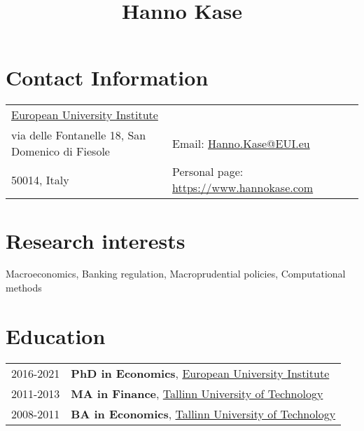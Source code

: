 \documentclass[a4, 11pt]{article}
\title{ {\Huge  Hanno Kase} }
\date{}
\begin{document}
    \maketitle


    \section*{Contact Information}
    \begin{table}[H]
      \begin{tabular}{ll}\href{https://www.eui.eu/}{European University Institute}&\\
        via delle Fontanelle 18, San Domenico di Fiesole&
        Email: \href{mailto:Hanno.Kase@EUI.eu}{Hanno.Kase@EUI.eu} \\
        50014, Italy& Personal page: \href{https://www.hannokase.com}{https://www.hannokase.com}
      \end{tabular}
    \end{table}

    \section*{Research interests}Macroeconomics, Banking regulation, Macroprudential policies, Computational methods

    \section*{Education}\begin{table}[H]
        \begin{tabular}{p{2cm}p{14cm}}
            2016-2021 & \textbf{PhD in Economics}, \href{https://www.eui.eu}{European University Institute}\\
            2011-2013 & \textbf{MA in Finance}, \href{https://www.ttu.ee/en}{Tallinn University of Technology}\\
            2008-2011 & \textbf{BA in Economics}, \href{https://www.ttu.ee/en}{Tallinn University of Technology}\\
        \end{tabular}
      \end{table}

\end{document}
